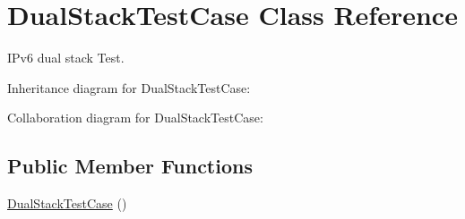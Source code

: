 \hypertarget{classDualStackTestCase}{}\section{Dual\+Stack\+Test\+Case Class Reference}
\label{classDualStackTestCase}


I\+Pv6 dual stack Test.  




Inheritance diagram for Dual\+Stack\+Test\+Case\+:


Collaboration diagram for Dual\+Stack\+Test\+Case\+:
\subsection*{Public Member Functions}
\begin{DoxyCompactItemize}
\item 
\hyperlink{classDualStackTestCase_ab787c94526066556ff44ad4ddf4a9384}{Dual\+Stack\+Test\+Case} ()
\end{DoxyCompactItemize}
